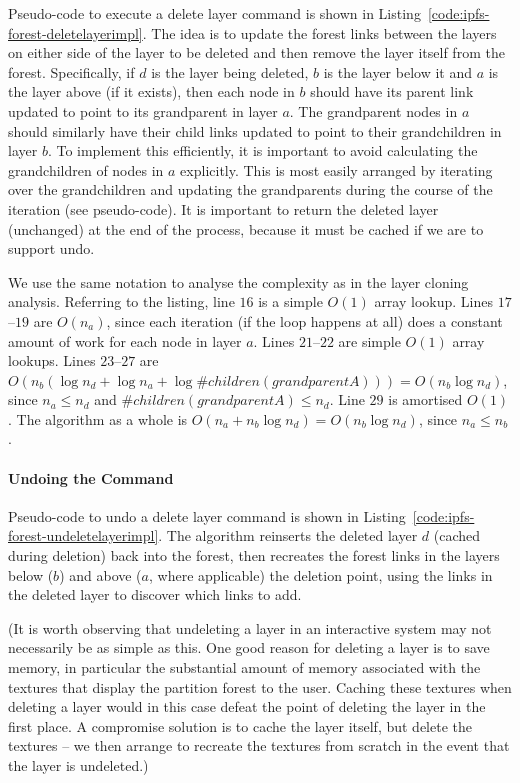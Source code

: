 Pseudo-code to execute a delete layer command is shown in Listing~\ref{code:ipfs-forest-deletelayerimpl}. The idea is to update the forest links between the layers on either side of the layer to be deleted and then remove the layer itself from the forest. Specifically, if $d$ is the layer being deleted, $b$ is the layer below it and $a$ is the layer above (if it exists), then each node in $b$ should have its parent link updated to point to its grandparent in layer $a$. The grandparent nodes in $a$ should similarly have their child links updated to point to their grandchildren in layer $b$. To implement this efficiently, it is important to avoid calculating the grandchildren of nodes in $a$ explicitly. This is most easily arranged by iterating over the grandchildren and updating the grandparents during the course of the iteration (see pseudo-code). It is important to return the deleted layer (unchanged) at the end of the process, because it must be cached if we are to support undo.

We use the same notation to analyse the complexity as in the layer cloning analysis. Referring to the listing, line $16$ is a simple $O(1)$ array lookup. Lines $17$--$19$ are $O(n_a)$, since each iteration (if the loop happens at all) does a constant amount of work for each node in layer $a$. Lines $21$--$22$ are simple $O(1)$ array lookups. Lines $23$--$27$ are $O(n_b (\log n_d + \log n_a + \log \#\mathit{children}(\mathit{grandparentA}))) = O(n_b \log n_d)$, since $n_a \le n_d$ and $\#\mathit{children}(\mathit{grandparentA}) \le n_d$. Line $29$ is amortised $O(1)$. The algorithm as a whole is $O(n_a + n_b \log n_d) = O(n_b \log n_d)$, since $n_a \le n_b$.

\paragraph{Undoing the Command}

Pseudo-code to undo a delete layer command is shown in Listing~\ref{code:ipfs-forest-undeletelayerimpl}. The algorithm reinserts the deleted layer $d$ (cached during deletion) back into the forest, then recreates the forest links in the layers below ($b$) and above ($a$, where applicable) the deletion point, using the links in the deleted layer to discover which links to add.

(It is worth observing that undeleting a layer in an interactive system may not necessarily be as simple as this. One good reason for deleting a layer is to save memory, in particular the substantial amount of memory associated with the textures that display the partition forest to the user. Caching these textures when deleting a layer would in this case defeat the point of deleting the layer in the first place. A compromise solution is to cache the layer itself, but delete the textures -- we then arrange to recreate the textures from scratch in the event that the layer is undeleted.)

